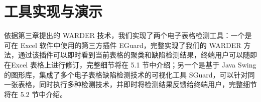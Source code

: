 \chapter{工具实现与演示}

依据第三章提出的 WARDER 技术，我们实现了两个电子表格检测工具：一个是可在 Excel 软件中使用的第三方插件 EGuard，完整实现了我们的 WARDER 方法，通过该插件可以即时看到当前表格的聚类和缺陷检测结果，终端用户可以随即在Excel 表格上进行修订，完整细节将在 5.1 节中介绍；另一个是基于 Java Swing 的图形库，集成了多个电子表格缺陷检测技术的可视化工具 SGuard，可以针对同一张表格，同时执行多种检测技术，并即时将检测结果反馈给终端用户，完整细节将在 5.2 节中介绍。




